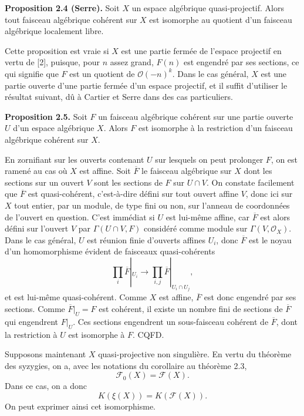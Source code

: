 \documentclass[11pt]{article}
\providecommand{\cF}{\mathscr F}
\providecommand{\cO}{\mathcal O}
\begin{document}
\textbf{Proposition 2.4 (Serre).} Soit $X$ un espace algébrique quasi-projectif. Alors tout faisceau algébrique cohérent sur $X$ est isomorphe au quotient d'un faisceau algébrique localement libre.

Cette proposition est vraie si $X$ est une partie fermée de l'espace projectif en vertu de [2], puisque, pour $n$ assez grand, $F(n)$ est engendré par ses sections, ce qui signifie que $F$ est un quotient de $\cO(-n)^k$. Dans le cas général, $X$ est une partie ouverte d'une partie fermée d'un espace projectif, et il suffit d'utiliser le résultat suivant, dû à Cartier et Serre dans des cas particuliers.

\textbf{Proposition 2.5.} Soit $F$ un faisceau algébrique cohérent sur une partie ouverte $U$ d'un espace algébrique $X$. Alors $F$ est isomorphe à la restriction d'un faisceau algébrique cohérent sur $X$.

En zornifiant sur les ouverts contenant $U$ sur lesquels on peut prolonger $F$, on est ramené au cas où $X$ est affine. Soit $\overline F$ le faisceau algébrique sur $X$ dont les sections sur un ouvert $V$ sont les sections de $F$ sur $U\cap V$. On constate facilement que $\overline F$ est quasi-cohérent, c'est-à-dire défini sur tout ouvert affine $V$, donc ici sur $X$ tout entier, par un module, de type fini ou non, sur l'anneau de coordonnées de l'ouvert en question. C'est immédiat si $U$ est lui-même affine, car $\overline F$ est alors défini sur l'ouvert $V$ par $\Gamma(U\cap V,F)$ considéré comme module sur $\Gamma(V,\cO_X)$. Dans le cas général, $U$ est réunion finie d'ouverts affines $U_i$, donc $\overline F$ est le noyau d'un homomorphisme évident de faisceaux quasi-cohérents
\[
 \prod_i \overline F|_{U_i}\longrightarrow \prod_{i,j}\overline F|_{U_i\cap U_j},
\]
et est lui-même quasi-cohérent. Comme $X$ est affine, $\overline F$ est donc engendré par ses sections. Comme $\overline F|_U=F$ est cohérent, il existe un nombre fini de sections de $\overline F$ qui engendrent $F|_U$. Ces sections engendrent un sous-faisceau cohérent de $\overline F$, dont la restriction à $U$ est isomorphe à $F$. CQFD.

Supposons maintenant $X$ quasi-projective non singulière. En vertu du théorème des syzygies, on a, avec les notations du corollaire au théorème 2.3,
\[
 \cF_0(X)=\cF(X).
\]
Dans ce cas, on a donc
\begin{equation}\tag{2.13}
 K(\xi(X))=K(\cF(X)).
\end{equation}
On peut exprimer ainsi cet isomorphisme.
\end{document}

